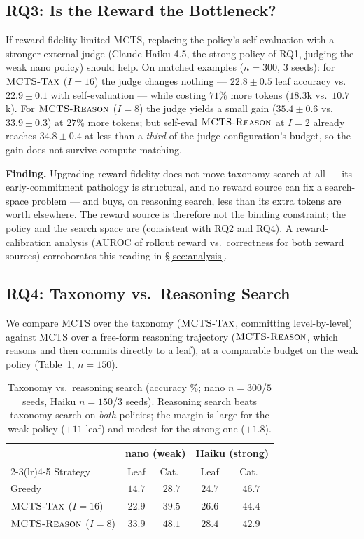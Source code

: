 \subsection{RQ3: Is the Reward the Bottleneck?}
If reward fidelity limited MCTS, replacing the policy's self-evaluation with a
stronger external judge (Claude-Haiku-4.5, the strong policy of RQ1, judging the
weak nano policy) should help. On matched examples ($n{=}300$, $3$ seeds):
for $\textsc{MCTS-Tax}$ ($I{=}16$) the judge changes nothing --- $22.8 \pm 0.5$ leaf
accuracy vs.\ $22.9 \pm 0.1$ with self-evaluation --- while costing $71\%$ more
tokens ($18.3$k vs.\ $10.7$k). For $\textsc{MCTS-Reason}$ ($I{=}8$) the judge yields a small
gain ($35.4 \pm 0.6$ vs.\ $33.9 \pm 0.3$) at $27\%$ more tokens; but self-eval
$\textsc{MCTS-Reason}$ at $I{=}2$ already reaches $34.8 \pm 0.4$ at less than a \emph{third}
of the judge configuration's budget, so the gain does not survive compute
matching.

\textbf{Finding.} Upgrading reward fidelity does not move taxonomy search at all
--- its early-commitment pathology is structural, and no reward source can fix a
search-space problem --- and buys, on reasoning search, less than its extra
tokens are worth elsewhere. The reward source is therefore not the binding
constraint; the policy and the search space are (consistent with RQ2 and RQ4).
A reward-calibration analysis (AUROC of rollout reward vs.\ correctness for
both reward sources) corroborates this reading in \S\ref{sec:analysis}.

\subsection{RQ4: Taxonomy vs.\ Reasoning Search}
We compare MCTS over the taxonomy ($\textsc{MCTS-Tax}$, committing level-by-level) against
MCTS over a free-form reasoning trajectory ($\textsc{MCTS-Reason}$, which reasons and then
commits directly to a leaf), at a comparable budget on the weak policy
(Table~\ref{tab:m4m5}, $n{=}150$).

\begin{table}[t]
\centering
\small
\begin{tabular}{l cc cc}
\toprule
 & \multicolumn{2}{c}{nano (weak)} & \multicolumn{2}{c}{Haiku (strong)} \\
\cmidrule(lr){2-3}\cmidrule(lr){4-5}
Strategy & Leaf & Cat.\ & Leaf & Cat.\ \\
\midrule
Greedy                & $14.7$ & $28.7$ & $24.7$ & $46.7$ \\
$\textsc{MCTS-Tax}$ ($I{=}16$) & $22.9$ & $39.5$ & $26.6$ & $44.4$ \\
$\textsc{MCTS-Reason}$ ($I{=}8$) & $\mathbf{33.9}$ & $\mathbf{48.1}$ & $\mathbf{28.4}$ & $42.9$ \\
\bottomrule
\end{tabular}
\caption{Taxonomy vs.\ reasoning search (accuracy \%; nano $n{=}300$/$5$ seeds,
Haiku $n{=}150$/$3$ seeds). Reasoning search beats taxonomy search on \emph{both}
policies; the margin is large for the weak policy ($+11$ leaf) and modest for the
strong one ($+1.8$).}
\label{tab:m4m5}
\end{table}

